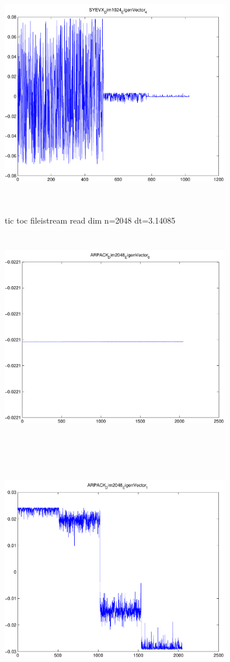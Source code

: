 \documentclass[9pt]{article}
\theoremstyle{plain}
\theoremstyle{definition}
\theoremstyle{remark}
\numberwithin{equation}{section}
\begin{document}
\includegraphics[width=10.0cm,height=10.0cm]{SYEVX_Dim1024_EigenVector_4.pdf}

tic toc fileistream read dim n=2048 dt=3.14085
\includegraphics[width=10.0cm,height=10.0cm]{ARPACK_Dim2048_EigenVector_0.pdf}

\includegraphics[width=10.0cm,height=10.0cm]{ARPACK_Dim2048_EigenVector_1.pdf}
\end{document}
